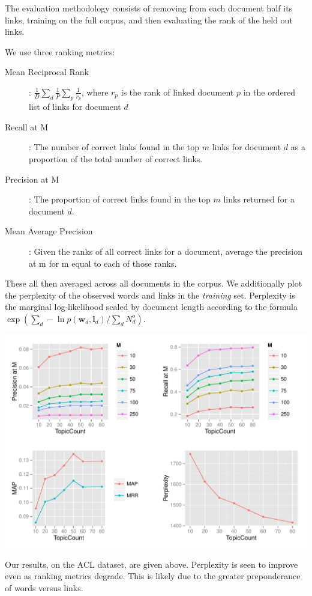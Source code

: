 \documentclass{sciposter}
\newcommand \vv[1] { \bm #1 }
\begin{document}
\begin{multicols}{3}
The evaluation methodology consists of removing from each document half its links, training on the full corpus, and then evaluating the rank of the held out links.

We use three ranking metrics:
\begin{description}
\item[Mean Reciprocal Rank]: $\frac{1}{D} \sum_d \frac{1}{P} \sum_p \frac{1}{r_p}$, where $r_p$ is the rank of linked document $p$ in the ordered list of links for document $d$ 
\item[Recall at M]: The number of correct links found in the top $m$ links for document $d$ as a proportion of the total number of correct links. 
\item[Precision at M]: The proportion of correct links found in the top $m$ links returned for a document $d$.
\item[Mean Average Precision]: Given the ranks of all correct links for a document, average the precision at m for m equal to each of those ranks. 
\end{description}
These all then averaged across all documents in the corpus. We additionally plot the perplexity of the observed words and links in the \emph{training} set. Perplexity is the marginal log-likelihood scaled by document length according to the formula $\exp\left(\sum_d -\ln p(\vv{w}_d,\vv{l}_d) / \sum_d N^o_d\right)$.

\includegraphics[scale=1.1]{images/RPlot.pdf}

Our results, on the ACL dataset, are given above. Perplexity is seen to improve even as ranking metrics degrade. This is likely due to the greater preponderance of words versus links.


\end{multicols}
\end{document}
